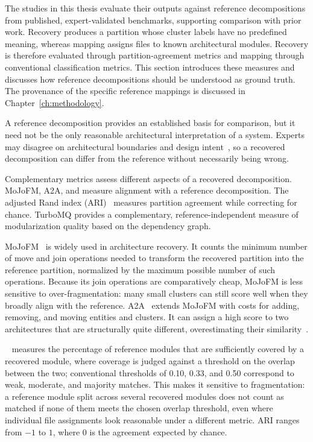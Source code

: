 The studies in this thesis evaluate their outputs against reference decompositions from published, expert-validated benchmarks, supporting comparison with prior work. Recovery produces a partition whose cluster labels have no predefined meaning, whereas mapping assigns files to known architectural modules. Recovery is therefore evaluated through partition-agreement metrics and mapping through conventional classification metrics. This section introduces these measures and discusses how reference decompositions should be understood as ground truth. The provenance of the specific reference mappings is discussed in Chapter~\ref{ch:methodology}.

A reference decomposition provides an established basis for comparison, but it need not be the only reasonable architectural interpretation of a system. Experts may disagree on architectural boundaries and design intent~\cite{garcia2013}, so a recovered decomposition can differ from the reference without necessarily being wrong.

Complementary metrics assess different aspects of a recovered decomposition. MoJoFM, A2A, and \cc{} measure alignment with a reference decomposition. The adjusted Rand index (ARI)~\cite{ari} measures partition agreement while correcting for chance. TurboMQ provides a complementary, reference-independent measure of modularization quality based on the dependency graph.

MoJoFM~\cite{mojofm} is widely used in architecture recovery. It counts the minimum number of move and join operations needed to transform the recovered partition into the reference partition, normalized by the maximum possible number of such operations. Because its join operations are comparatively cheap, MoJoFM is less sensitive to over-fragmentation: many small clusters can still score well when they broadly align with the reference. A2A~\cite{a2a} extends MoJoFM with costs for adding, removing, and moving entities and clusters. It can assign a high score to two architectures that are structurally quite different, overestimating their similarity~\cite{turbomq}.

\cc{}~\cite{c2c} measures the percentage of reference modules that are sufficiently covered by a recovered module, where coverage is judged against a threshold on the overlap between the two; conventional thresholds of 0.10, 0.33, and 0.50 correspond to weak, moderate, and majority matches. This makes it sensitive to fragmentation: a reference module split across several recovered modules does not count as matched if none of them meets the chosen overlap threshold, even where individual file assignments look reasonable under a different metric. ARI ranges from $-1$ to $1$, where $0$ is the agreement expected by chance.

